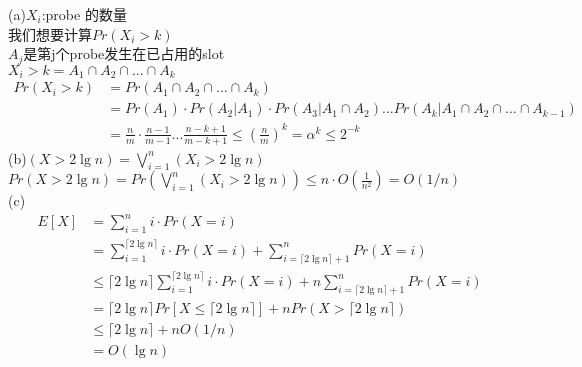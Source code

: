 \documentclass[a4paper, justified]{tufte-handout}
\begin{document}
\begin{solution}
  (a)$X_i$:probe 的数量\\
  我们想要计算$Pr(X_i > k)$\\
  $A_j$是第j个probe发生在已占用的slot\\
  $X_i>k=A_1\cap A_2 \cap ... \cap A_k$\\
  $$
    \begin{aligned}
      Pr(X_i>k) & = Pr(A_1\cap A_2 \cap ... \cap A_k)                                                                    \\
                & =Pr(A_1)\cdot Pr(A_2|A_1)\cdot Pr(A_3|A_1\cap A_2)...Pr(A_k|A_1\cap A_2 \cap ... \cap A_{k-1})         \\
                & = \frac{n}{m}\cdot \frac{n-1}{m-1} ... \frac{n-k+1}{m-k+1}\leq (\frac{n}{m})^k = \alpha ^k \leq 2^{-k}
    \end{aligned}
  $$
  (b)$(X>2 \lg n) = \bigvee ^n _{i=1}(X_i > 2 \lg n)$\\
  $Pr(X>2 \lg n) = Pr(\bigvee ^n _{i=1}(X_i > 2 \lg n))\leq n \cdot O(\frac{1}{n^2})=O(1/n)$\\
  (c)$$
    \begin{aligned}
      E[X] & = \sum^n_{i=1} i\cdot Pr(X = i)                                                                                              \\
           & =\sum^{\lceil 2 \lg n\rceil }_{i=1}i\cdot Pr(X = i)+\sum^n_{i = \lceil 2 \lg n\rceil + 1}Pr(X = i)                           \\
           & \leq \lceil 2 \lg n\rceil \sum^{\lceil 2 \lg n\rceil }_{i=1}i\cdot Pr(X = i)+n\sum^n_{i = \lceil 2 \lg n\rceil + 1}Pr(X = i) \\
           & =\lceil 2 \lg n\rceil Pr[X\leq \lceil 2 \lg n\rceil]+nPr(X>\lceil 2 \lg n\rceil)                                             \\
           & \leq \lceil 2 \lg n\rceil + nO(1/n)                                                                                          \\
           & = O(\lg n)
    \end{aligned}
  $$
\end{solution}

\begin{problem}[TC Problem 11-2]
\end{problem}
\end{document}
